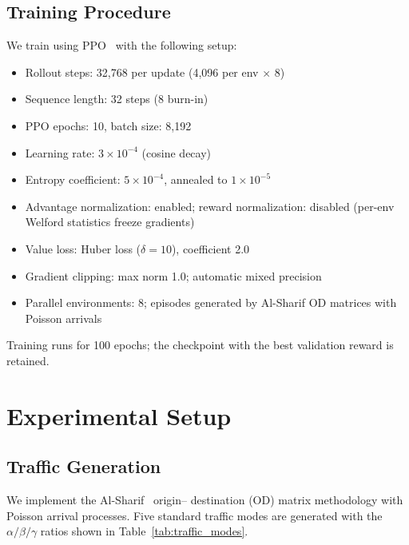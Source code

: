 \documentclass{ieeeaccess}
\begin{document}
\subsection{Training Procedure}

We train using PPO~\cite{schulman2017ppo} with the following setup:
\begin{itemize}
    \item Rollout steps: 32,768 per update (4,096 per env $\times$ 8)
    \item Sequence length: 32 steps (8 burn-in)
    \item PPO epochs: 10, batch size: 8,192
    \item Learning rate: $3 \times 10^{-4}$ (cosine decay)
    \item Entropy coefficient: $5 \times 10^{-4}$, annealed to
    $1 \times 10^{-5}$
    \item Advantage normalization: enabled; reward normalization:
    disabled (per-env Welford statistics freeze gradients)
    \item Value loss: Huber loss ($\delta=10$), coefficient 2.0
    \item Gradient clipping: max norm 1.0; automatic mixed precision
    \item Parallel environments: 8; episodes generated by
    Al-Sharif OD matrices with Poisson arrivals
\end{itemize}
Training runs for 100 epochs; the checkpoint with the best validation
reward is retained.

\section{Experimental Setup}
\label{sec:experiments}

\subsection{Traffic Generation}

We implement the Al-Sharif~\cite{alsharif2020traffic} origin--
destination (OD) matrix methodology with Poisson arrival processes.
Five standard traffic modes are generated with the $\alpha/\beta/
\gamma$ ratios shown in Table~\ref{tab:traffic_modes}.
\end{document}
